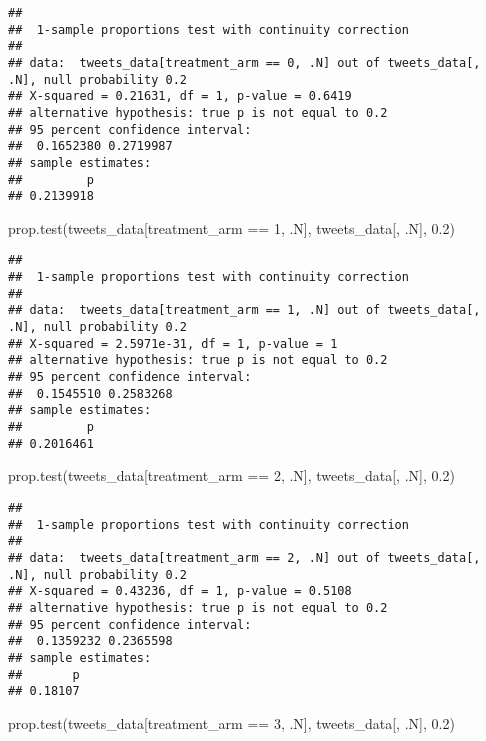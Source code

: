 \documentclass[
]{article}
\newenvironment{Shaded}{\begin{snugshade}}{\end{snugshade}}
\newcommand{\DecValTok}[1]{\textcolor[rgb]{0.00,0.00,0.81}{#1}}
\newcommand{\FloatTok}[1]{\textcolor[rgb]{0.00,0.00,0.81}{#1}}
\newcommand{\FunctionTok}[1]{\textcolor[rgb]{0.00,0.00,0.00}{#1}}
\newcommand{\NormalTok}[1]{#1}
\newcommand{\SpecialCharTok}[1]{\textcolor[rgb]{0.00,0.00,0.00}{#1}}
\begin{document}
\begin{verbatim}
## 
##  1-sample proportions test with continuity correction
## 
## data:  tweets_data[treatment_arm == 0, .N] out of tweets_data[, .N], null probability 0.2
## X-squared = 0.21631, df = 1, p-value = 0.6419
## alternative hypothesis: true p is not equal to 0.2
## 95 percent confidence interval:
##  0.1652380 0.2719987
## sample estimates:
##         p 
## 0.2139918
\end{verbatim}

\begin{Shaded}
\begin{Highlighting}[]
\FunctionTok{prop.test}\NormalTok{(tweets\_data[treatment\_arm }\SpecialCharTok{==} \DecValTok{1}\NormalTok{, .N], tweets\_data[, .N], }\FloatTok{0.2}\NormalTok{)}
\end{Highlighting}
\end{Shaded}

\begin{verbatim}
## 
##  1-sample proportions test with continuity correction
## 
## data:  tweets_data[treatment_arm == 1, .N] out of tweets_data[, .N], null probability 0.2
## X-squared = 2.5971e-31, df = 1, p-value = 1
## alternative hypothesis: true p is not equal to 0.2
## 95 percent confidence interval:
##  0.1545510 0.2583268
## sample estimates:
##         p 
## 0.2016461
\end{verbatim}

\begin{Shaded}
\begin{Highlighting}[]
\FunctionTok{prop.test}\NormalTok{(tweets\_data[treatment\_arm }\SpecialCharTok{==} \DecValTok{2}\NormalTok{, .N], tweets\_data[, .N], }\FloatTok{0.2}\NormalTok{)}
\end{Highlighting}
\end{Shaded}

\begin{verbatim}
## 
##  1-sample proportions test with continuity correction
## 
## data:  tweets_data[treatment_arm == 2, .N] out of tweets_data[, .N], null probability 0.2
## X-squared = 0.43236, df = 1, p-value = 0.5108
## alternative hypothesis: true p is not equal to 0.2
## 95 percent confidence interval:
##  0.1359232 0.2365598
## sample estimates:
##       p 
## 0.18107
\end{verbatim}

\begin{Shaded}
\begin{Highlighting}[]
\FunctionTok{prop.test}\NormalTok{(tweets\_data[treatment\_arm }\SpecialCharTok{==} \DecValTok{3}\NormalTok{, .N], tweets\_data[, .N], }\FloatTok{0.2}\NormalTok{)}
\end{Highlighting}
\end{Shaded}
\end{document}

